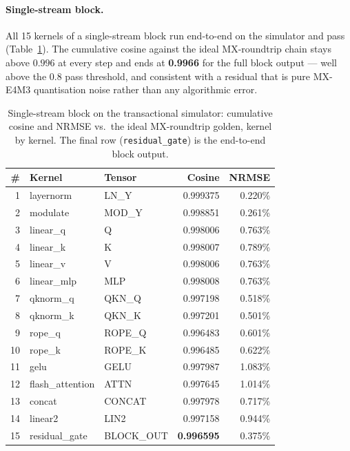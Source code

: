 \documentclass[11pt]{report}
\begin{document}
\paragraph{Single-stream block.} All 15 kernels of a single-stream block run
end-to-end on the simulator and pass (Table~\ref{tab:sim-ssb}). The cumulative
cosine against the ideal MX-roundtrip chain stays above $0.996$ at every step
and ends at \textbf{0.9966} for the full block output --- well above the
$0.8$ pass threshold, and consistent with a residual that is pure MX-E4M3
quantisation noise rather than any algorithmic error.

\begin{table}[h]
\centering
\caption{Single-stream block on the transactional simulator: cumulative cosine
and NRMSE vs.\ the ideal MX-roundtrip golden, kernel by kernel. The final row
(\texttt{residual\_gate}) is the end-to-end block output.}
\label{tab:sim-ssb}
\begin{tabular}{@{}rllrr@{}}
\toprule
\# & Kernel & Tensor & Cosine & NRMSE \\
\midrule
1  & layernorm       & LN\_Y      & 0.999375 & 0.220\% \\
2  & modulate        & MOD\_Y     & 0.998851 & 0.261\% \\
3  & linear\_q       & Q          & 0.998006 & 0.763\% \\
4  & linear\_k       & K          & 0.998007 & 0.789\% \\
5  & linear\_v       & V          & 0.998006 & 0.763\% \\
6  & linear\_mlp     & MLP        & 0.998008 & 0.763\% \\
7  & qknorm\_q       & QKN\_Q     & 0.997198 & 0.518\% \\
8  & qknorm\_k       & QKN\_K     & 0.997201 & 0.501\% \\
9  & rope\_q         & ROPE\_Q    & 0.996483 & 0.601\% \\
10 & rope\_k         & ROPE\_K    & 0.996485 & 0.622\% \\
11 & gelu            & GELU       & 0.997987 & 1.083\% \\
12 & flash\_attention& ATTN       & 0.997645 & 1.014\% \\
13 & concat          & CONCAT     & 0.997978 & 0.717\% \\
14 & linear2         & LIN2       & 0.997158 & 0.944\% \\
15 & residual\_gate  & BLOCK\_OUT & \textbf{0.996595} & 0.375\% \\
\bottomrule
\end{tabular}
\end{table}
\end{document}
